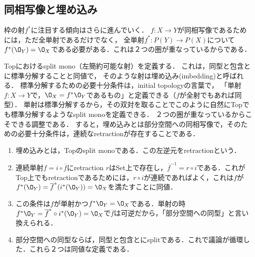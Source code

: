 \documentclass[uplatex,dvipdfmx]{jsreport}
\begin{document}
\subsection{同相写像と埋め込み}

\begin{tcolorbox}[colframe=ForestGreen, colback=ForestGreen!10!white, breakable]
    枠の射$f^*$に注目する傾向はさらに進んでいく．
    $f:X\to Y$が同相写像であるためには，ただ全単射であるだけでなく，
    全単射$f^*:P(Y)\to P(X)$について$f^*(\O_Y)=\O_X$である必要がある．これは２つの圏が重なっているからである．

    Topにおけるsplit mono（左簡約可能な射）を定義する．
    これは，同型と包含とに標準分解することと同値で，
    そのような射は埋め込み(imbedding)と呼ばれる．
    標準分解するための必要十分条件は，initial topologyの言葉で，
    「単射$f:X\to Y$で，$\O_X=f^*\O_Y$であるもの」と定義できる（$f$が全射でもあれば同型）．
    単射は標準分解するから，その双対を取ることでこのように自然にTopでも標準分解するようなsplit monoを定義できる．
    ２つの圏が重なっているからこそできる調整である．
    すると，埋め込みとは部分空間への同相写像で，そのための必要十分条件は，連続なretractionが存在することである．
    \begin{enumerate}
        \item 埋め込みとは，Topのsplit monoである．この左逆元をretractionという．
        \item 連続単射$f=i\circ\overline{f}$にretraction $r$はSet上で存在し，$\overline{f}^{-1}=r\circ i$である．これがTop上でもretractionであるためには，$r\circ i$が連続であればよく，これは$f$が$f^*(\O_Y)=\overline{f}^*(i^*(\O_Y))=\O_X$を満たすことに同値．
        \item この条件は$f$が単射かつ$f^*\O_Y=\O_X$である．単射の時$f^*\O_Y=\overline{f}^*\circ i^*(\O_Y)=\O_X$で$\overline{f}$は可逆だから，「部分空間への同型」と言い換えられる．
        \item 部分空間への同型ならば，同型と包含とにsplitである．これで議論が循環した．これら２つは同値な定義である．
    \end{enumerate}
\end{tcolorbox}
\end{document}
